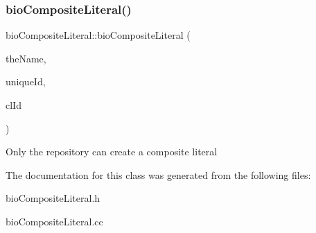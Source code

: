 \subsubsection{\texorpdfstring{bio\+Composite\+Literal()}{bioCompositeLiteral()}}
{\footnotesize\ttfamily bio\+Composite\+Literal\+::bio\+Composite\+Literal (\begin{DoxyParamCaption}\item[{pat\+String}]{the\+Name,  }\item[{pat\+U\+Long}]{unique\+Id,  }\item[{pat\+U\+Long}]{cl\+Id }\end{DoxyParamCaption})\hspace{0.3cm}{\ttfamily [protected]}}

Only the repository can create a composite literal 

The documentation for this class was generated from the following files\+:\begin{DoxyCompactItemize}
\item 
bio\+Composite\+Literal.\+h\item 
bio\+Composite\+Literal.\+cc\end{DoxyCompactItemize}

